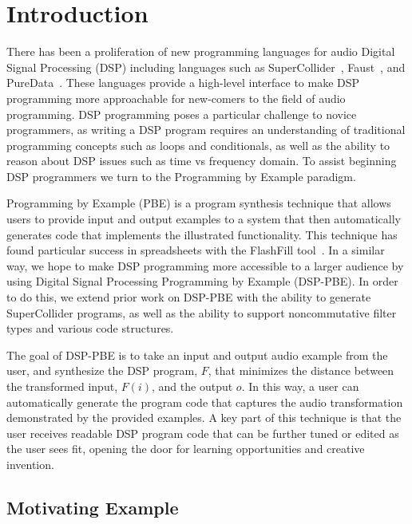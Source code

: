 
\section{Introduction}

There has been a proliferation of new programming languages for audio Digital Signal Processing (DSP) including languages such as SuperCollider~\cite{supercollider}, Faust~\cite{orlarey2009faust}, and PureData~\cite{puredata}.
These languages provide a high-level interface to make DSP programming more approachable for new-comers to the field of audio programming.
DSP programming poses a particular challenge to novice programmers, as writing a DSP program requires an understanding of traditional programming concepts such as loops and conditionals, as well as the ability to reason about DSP issues such as time vs frequency domain.
To assist beginning DSP programmers we turn to the Programming by Example paradigm.

Programming by Example (PBE) is a program synthesis technique that allows users to provide input and output examples to a system that then automatically generates code that implements the illustrated functionality.
This technique has found particular success in spreadsheets with the FlashFill tool~\cite{flashfill}.
In a similar way, we hope to make DSP programming more accessible to a larger audience by using Digital Signal Processing Programming by Example (DSP-PBE).
In order to do this, we extend prior work on DSP-PBE with the ability to generate SuperCollider programs, as well as the ability to support noncommutative filter types and various code structures.

The goal of DSP-PBE is to take an input and output audio example from the user, and synthesize the DSP program, $F$, that minimizes the distance between the transformed input, $F(i)$, and the output $o$.
In this way, a user can automatically generate the program code that captures the audio transformation demonstrated by the provided examples.
A key part of this technique is that the user receives readable DSP program code that can be further tuned or edited as the user sees fit, opening the door for learning opportunities and creative invention.


\subsection{Motivating Example}


